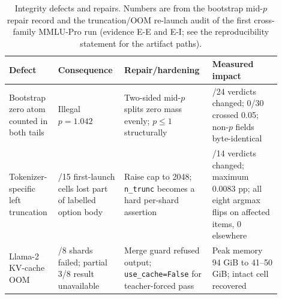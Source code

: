 \begin{table}[!htbp]
\centering
\small
\setlength{\tabcolsep}{4.2pt}
\begin{tabular}{>{\raggedright\arraybackslash}p{0.16\linewidth}>{\raggedright\arraybackslash}p{0.22\linewidth}>{\raggedright\arraybackslash}p{0.28\linewidth}>{\raggedright\arraybackslash}p{0.24\linewidth}}
\toprule
Defect & Consequence & Repair/hardening & Measured impact \\
\midrule
Bootstrap zero atom counted in both tails & Illegal $p=1.042$ & Two-sided mid-$p$ splits zero mass evenly; $p\leq1$ structurally & 0/24 verdicts changed; 0/30 crossed 0.05; non-$p$ fields byte-identical \\
Tokenizer-specific left truncation & 10/15 first-launch cells lost part of labelled option body & Raise cap to 2048; \texttt{n\_trunc} becomes a hard per-shard assertion & 0/14 verdicts changed; maximum 0.0083 pp; all eight argmax flips on affected items, 0 elsewhere \\
Llama-2 KV-cache OOM & 5/8 shards failed; partial 3/8 result unavailable & Merge guard refused output; \texttt{use\_cache=False} for teacher-forced pass & Peak memory 94 GiB to 41--50 GiB; intact cell recovered \\
\bottomrule
\end{tabular}
\caption{Integrity defects and repairs. Numbers are from the bootstrap mid-$p$ repair record and the truncation/OOM re-launch audit of the first cross-family MMLU-Pro run (evidence \textsf{E-E} and \textsf{E-I}; see the reproducibility statement for the artifact paths).}
\label{tab:integrity}
\end{table}
